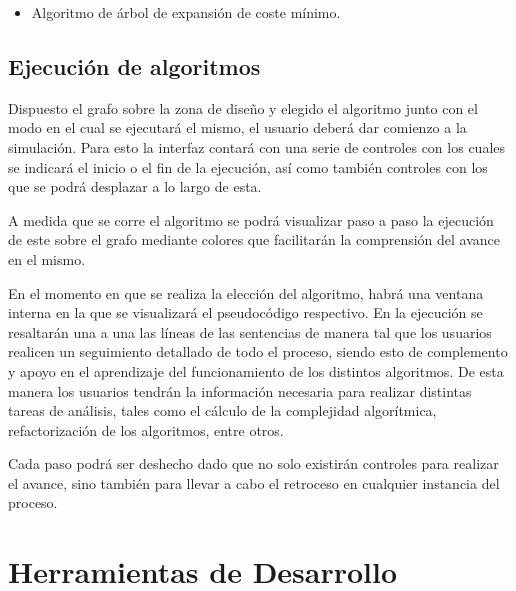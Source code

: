 \documentclass{book}
\begin{document}
	\begin{itemize}
		\renewcommand{\labelitemi}{\scriptsize\tiny$\blacksquare$} 
		\itemsep=2pt \topsep=0pt \partopsep=0pt \parskip=0pt \parsep=0pt
		
		\item Algoritmo de árbol de expansión de coste mínimo.

	\end{itemize}
	\medskip



\section{Ejecución de algoritmos}

Dispuesto el grafo sobre la zona de diseño y elegido el algoritmo junto con el modo en el cual se ejecutará el mismo, el usuario deberá dar comienzo a la simulación. Para esto la interfaz contará con una serie de controles con los cuales se indicará el inicio o el fin de la ejecución, así como también controles con los que se podrá desplazar a lo largo de esta.
\par
A medida que se corre el algoritmo se podrá visualizar paso a paso la ejecución de este sobre el grafo mediante colores que facilitarán la comprensión del avance en el mismo.
\par
En el momento en que se realiza la elección del algoritmo, habrá una ventana interna en la que se visualizará el pseudocódigo respectivo. En la ejecución se resaltarán una a una las líneas de las sentencias de manera tal que los usuarios realicen un seguimiento detallado de todo el proceso, siendo esto de complemento y apoyo en el aprendizaje del funcionamiento de los distintos algoritmos. De esta manera los usuarios tendrán la información necesaria para realizar distintas tareas de análisis, tales como el cálculo de la complejidad algorítmica, refactorización de los algoritmos, entre otros.
\par
Cada paso podrá ser deshecho dado que no solo existirán controles para realizar el avance, sino también para llevar a cabo el retroceso en cualquier instancia del proceso.



%
%
\chapter{Herramientas de Desarrollo}


\end{document}
